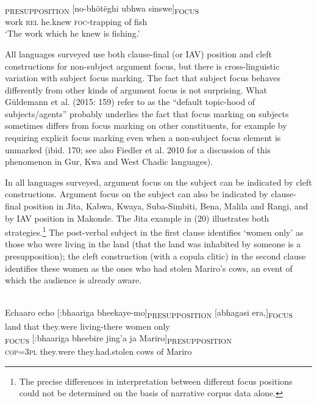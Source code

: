 \documentclass[output=paper]{langsci/langscibook}
\begin{document}
\ea\label{ex:}
\\
\textsubscript{PRESUPPOSITION} [no-bhötëghi ubhwa sinswe]\textsubscript{FOCUS}\\
work \textsc{rel }he.knew \textsc{foc}{}-trapping of fish\\


\upshape
‘The work which he knew is fishing.’
\z

All languages surveyed use both clause-final (or IAV) position and cleft constructions for non-subject argument focus, but there is cross-linguistic variation with subject focus marking. The fact that subject focus behaves differently from other kinds of argument focus is not surprising. What Güldemann et al. (2015: 159) refer to as the “default topic-hood of subjects/agents” probably underlies the fact that focus marking on subjects sometimes differs from focus marking on other constituents, for example by requiring explicit focus marking even when a non-subject focus element is unmarked (ibid. 170; see also Fiedler et al. 2010 for a discussion of this phenomenon in Gur, Kwa and West Chadic languages).

In all languages surveyed, argument focus on the subject can be indicated by cleft constructions. Argument focus on the subject can also be indicated by clause-final position in Jita, Kabwa, Kwaya, Suba-Simbiti, Bena, Malila and Rangi, and by IAV position in Makonde. The Jita example in (20) illustrates both strategies.\footnote{The precise differences in interpretation between different focus positions could not be determined on the basis of narrative corpus data alone.} The post-verbal subject in the first clause identifies ‘women only’ as those who were living in the land (that the land was inhabited by someone is a presupposition); the cleft construction (with a copula clitic) in the second clause identifies these women as the ones who had stolen Mariro’s cows, an event of which the audience is already aware.

\ea\label{ex:}
\\
\gll Echaaro echo [:bhaariga bheekaye-mo]\textsubscript{PRESUPPOSITION} [abhagasi era,]\textsubscript{FOCUS}\\
land that they.were living-there women only\\


\gll [ni=bho]\textsubscript{FOCUS} [:bhaariga bheebire jing’a ja Mariro]\textsubscript{PRESUPPOSITION}\\
\textsc{cop=3pl} they.were they.had.stolen cows of Mariro\\
\end{document}
